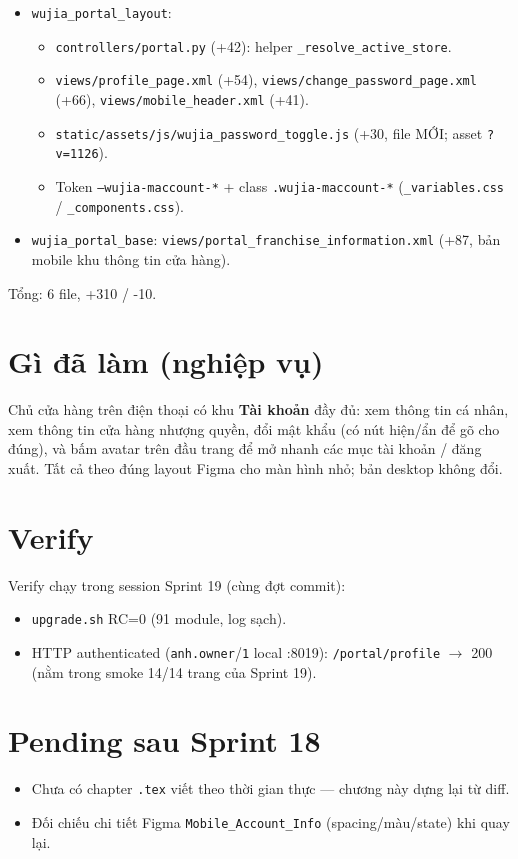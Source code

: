 \begin{itemize}
  \item \texttt{wujia\_portal\_layout}:
    \begin{itemize}
      \item \texttt{controllers/portal.py} (+42): helper \texttt{\_resolve\_active\_store}.
      \item \texttt{views/profile\_page.xml} (+54), \texttt{views/change\_password\_page.xml}
            (+66), \texttt{views/mobile\_header.xml} (+41).
      \item \texttt{static/assets/js/wujia\_password\_toggle.js} (+30, file MỚI; asset
            \texttt{?v=1126}).
      \item Token \texttt{--wujia-maccount-*} + class \texttt{.wujia-maccount-*}
            (\texttt{\_variables.css} / \texttt{\_components.css}).
    \end{itemize}
  \item \texttt{wujia\_portal\_base}: \texttt{views/portal\_franchise\_information.xml}
        (+87, bản mobile khu thông tin cửa hàng).
\end{itemize}

Tổng: 6 file, +310 / -10.

\section{Gì đã làm (nghiệp vụ)}

Chủ cửa hàng trên điện thoại có khu \textbf{Tài khoản} đầy đủ: xem thông tin cá nhân, xem
thông tin cửa hàng nhượng quyền, đổi mật khẩu (có nút hiện/ẩn để gõ cho đúng), và bấm avatar
trên đầu trang để mở nhanh các mục tài khoản / đăng xuất. Tất cả theo đúng layout Figma cho
màn hình nhỏ; bản desktop không đổi.

\section{Verify}

Verify chạy trong session Sprint 19 (cùng đợt commit):

\begin{itemize}
  \item \texttt{upgrade.sh} RC=0 (91 module, log sạch).
  \item HTTP authenticated (\texttt{anh.owner}/\texttt{1} local :8019): \texttt{/portal/profile}
        \(\rightarrow\) 200 (nằm trong smoke 14/14 trang của Sprint 19).
\end{itemize}

\section{Pending sau Sprint 18}

\begin{itemize}
  \item Chưa có chapter \texttt{.tex} viết theo thời gian thực --- chương này dựng lại từ diff.
  \item Đối chiếu chi tiết Figma \texttt{Mobile\_Account\_Info} (spacing/màu/state) khi quay lại.
\end{itemize}
